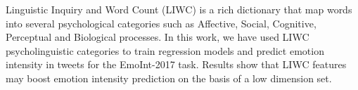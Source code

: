 Linguistic Inquiry and Word Count (LIWC) is a rich dictionary that map words into several psychological categories such as Affective, Social, Cognitive, Perceptual and Biological processes. In this work, we have used LIWC psycholinguistic categories to train regression models and predict emotion intensity in tweets for the EmoInt-2017 task. Results show that LIWC features may boost emotion intensity prediction on the basis of a low dimension set.
